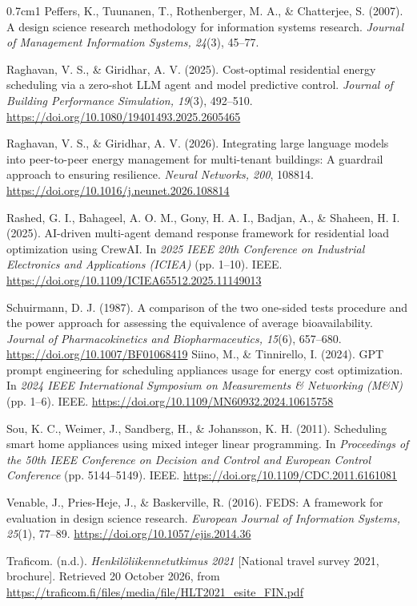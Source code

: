 \documentclass[12pt,a4paper]{report}
\begin{document}
\begin{hangparas}{0.7cm}{1}
Peffers, K., Tuunanen, T., Rothenberger, M. A., \& Chatterjee, S.
(2007). A design science research methodology for information systems
research. \textit{Journal of Management Information Systems, 24}(3),
45--77.

Raghavan, V. S., \& Giridhar, A. V. (2025). Cost-optimal residential
energy scheduling via a zero-shot LLM agent and model predictive
control. \textit{Journal of Building Performance Simulation, 19}(3),
492--510. \url{https://doi.org/10.1080/19401493.2025.2605465}

Raghavan, V. S., \& Giridhar, A. V. (2026). Integrating large language
models into peer-to-peer energy management for multi-tenant buildings: A
guardrail approach to ensuring resilience. \textit{Neural Networks,
200}, 108814. \url{https://doi.org/10.1016/j.neunet.2026.108814}

Rashed, G. I., Bahageel, A. O. M., Gony, H. A. I., Badjan, A., \&
Shaheen, H. I. (2025). AI-driven multi-agent demand response framework
for residential load optimization using CrewAI. In \textit{2025 IEEE
20th Conference on Industrial Electronics and Applications (ICIEA)}
(pp. 1--10). IEEE.
\url{https://doi.org/10.1109/ICIEA65512.2025.11149013}

Schuirmann, D. J. (1987). A comparison of the two one-sided tests
procedure and the power approach for assessing the equivalence of
average bioavailability. \textit{Journal of Pharmacokinetics and
Biopharmaceutics, 15}(6), 657--680.
\url{https://doi.org/10.1007/BF01068419}
Siino, M., \& Tinnirello, I. (2024). GPT prompt engineering for
scheduling appliances usage for energy cost optimization. In
\textit{2024 IEEE International Symposium on Measurements \& Networking
(M\&N)} (pp. 1--6). IEEE.
\url{https://doi.org/10.1109/MN60932.2024.10615758}

Sou, K. C., Weimer, J., Sandberg, H., \& Johansson, K. H. (2011).
Scheduling smart home appliances using mixed integer linear
programming. In \textit{Proceedings of the 50th IEEE Conference on
Decision and Control and European Control Conference} (pp. 5144--5149).
IEEE. \url{https://doi.org/10.1109/CDC.2011.6161081}

Venable, J., Pries-Heje, J., \& Baskerville, R. (2016). FEDS: A
framework for evaluation in design science research. \textit{European
Journal of Information Systems, 25}(1), 77--89.
\url{https://doi.org/10.1057/ejis.2014.36}

Traficom. (n.d.). \textit{Henkilöliikennetutkimus 2021} [National
travel survey 2021, brochure]. Retrieved 20 October 2026, from
\url{https://traficom.fi/files/media/file/HLT2021_esite_FIN.pdf}


\end{hangparas}
\end{document}

